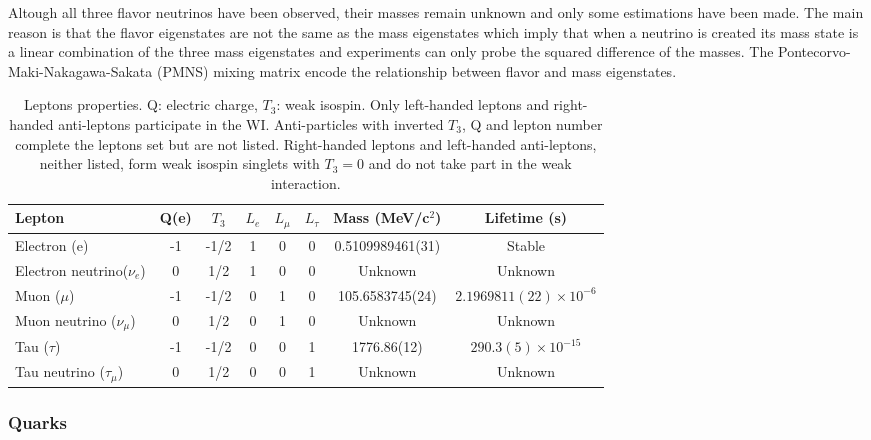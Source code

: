 \noindent Altough all three flavor neutrinos have been observed, their masses remain unknown and only some estimations have been made\cite{nu_mass}. The main reason is that the flavor eigenstates are not the same as the mass eigenstates which imply that when a neutrino is created its mass state is a linear combination of the three mass eigenstates and experiments can only probe the squared difference of the masses. The Pontecorvo-Maki-Nakagawa-Sakata (PMNS) mixing matrix encode the relationship between flavor and mass eigenstates.
\begin{center}
\begin{table}[h]
\centering
\footnotesize
\begin{tabular}{lccccccc} \hline
Lepton                      & Q(e) & $T_3$&$L_e$ & $L_\mu$ & $L_\tau$ & Mass (MeV/c$^2$) & Lifetime (s)                \\ \hline
Electron (e)                & -1   & -1/2 & 1    & 0       & 0        & 0.5109989461(31) & Stable                      \\ %
Electron neutrino($\nu_e$)  & 0    &  1/2 & 1    & 0       & 0        & Unknown          & Unknown                     \\ %
Muon ($\mu$)                & -1   & -1/2 & 0    & 1       & 0        & 105.6583745(24)  & $2.1969811(22)\times10^{-6}$\\ %
Muon neutrino ($\nu_\mu$)   & 0    &  1/2 & 0    & 1       & 0        & Unknown          & Unknown                     \\ %
Tau ($\tau$)                & -1   & -1/2 & 0    & 0       & 1        & 1776.86(12)      & $290.3(5)\times10^{-15}$    \\ %
Tau neutrino ($\tau_\mu$)   & 0    &  1/2 & 0    & 0       & 1        & Unknown          & Unknown                     \\ \hline
\end{tabular}
\caption[Leptons properties.]{Leptons properties\cite{pdg}. Q: electric charge, $T_3$: weak isospin. Only left-handed leptons and right-handed anti-leptons participate in the WI. Anti-particles with inverted $T_3$, Q and lepton number complete the leptons set but are not listed. Right-handed leptons and left-handed anti-leptons, neither listed, form weak isospin singlets with $T_3=0$ and do not take part in the weak interaction.}\label{leptons}
\end{table}
\end{center}

\subsubsection{Quarks}

